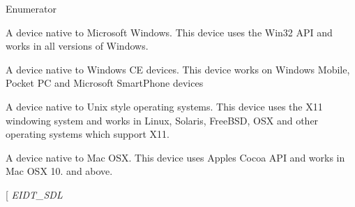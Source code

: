 \begin{Desc}
\item[Enumerator]\par
\begin{description}
\item[{\em 
E\+I\+D\+T\+\_\+\+W\+I\+N32\hypertarget{namespaceirr_ac25d94cf2e1037c7ca18ee79b3bd4505a20fb61ff76bfa2269a5f9e41d50018f1}{}\label{namespaceirr_ac25d94cf2e1037c7ca18ee79b3bd4505a20fb61ff76bfa2269a5f9e41d50018f1}
}]A device native to Microsoft Windows. This device uses the Win32 A\+PI and works in all versions of Windows. \item[{\em 
E\+I\+D\+T\+\_\+\+W\+I\+N\+CE\hypertarget{namespaceirr_ac25d94cf2e1037c7ca18ee79b3bd4505a839d8602c1a118791425d3df0d31ced1}{}\label{namespaceirr_ac25d94cf2e1037c7ca18ee79b3bd4505a839d8602c1a118791425d3df0d31ced1}
}]A device native to Windows CE devices. This device works on Windows Mobile, Pocket PC and Microsoft Smart\+Phone devices \item[{\em 
E\+I\+D\+T\+\_\+\+X11\hypertarget{namespaceirr_ac25d94cf2e1037c7ca18ee79b3bd4505aa084c40bd6cc595378d28182dd74ff80}{}\label{namespaceirr_ac25d94cf2e1037c7ca18ee79b3bd4505aa084c40bd6cc595378d28182dd74ff80}
}]A device native to Unix style operating systems. This device uses the X11 windowing system and works in Linux, Solaris, Free\+B\+SD, O\+SX and other operating systems which support X11. \item[{\em 
E\+I\+D\+T\+\_\+\+O\+SX\hypertarget{namespaceirr_ac25d94cf2e1037c7ca18ee79b3bd4505a140f80a523981af1487cd774e9a2a656}{}\label{namespaceirr_ac25d94cf2e1037c7ca18ee79b3bd4505a140f80a523981af1487cd774e9a2a656}
}]A device native to Mac O\+SX. This device uses Apple\textquotesingle{}s Cocoa A\+PI and works in Mac O\+SX 10. and above. \item[{\em 
E\+I\+D\+T\+\_\+\+S\+DL\hypertarget{namespaceirr_ac25d94cf2e1037c7ca18ee79b3bd4505ab9cafb4f0108f3fd5da94e886b529979}{}\label{namespaceirr_ac25d94cf2e1037c7ca18ee79b3bd4505ab9cafb4f0108f3fd5da94e886b529979}
}
\end{description}
\end{Desc}

